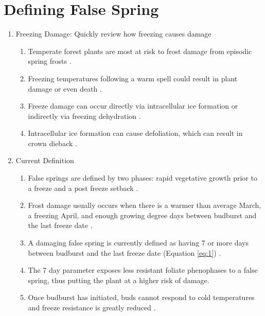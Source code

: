 \documentclass{article}\usepackage[]{graphicx}\usepackage[]{color}
\begin{document}


\section*{Defining False Spring}
\begin{enumerate}
\item Freezing Damage: Quickly review how freezing causes damage 
\begin{enumerate}
\item Temperate forest plants are most at risk to frost damage from episodic spring frosts \citep{Sakai1987}. 
\item Freezing temperatures following a warm spell could result in plant damage or even death \citep{Ludlum1968, Mock2007}.
\item Freeze damage can occur directly via intracellular ice formation or indirectly via freezing dehydration \citep{Pearce2001, Beck2004, Hofmann2015}.
\item Intracellular ice formation can cause defoliation, which can result in crown dieback \citep{Gu2008}. %
\end {enumerate}

\item Current Definition
\begin{enumerate}
\item False springs are defined by two phases: rapid vegetative growth prior to a freeze and a post freeze setback \citep{Gu2008}.
\item Frost damage usually occurs when there is a warmer than average March, a freezing April, and enough growing degree days between budburst and the last freeze date \citep{Augspurger2013}.
\item A damaging false spring is currently defined as having 7 or more days between budburst and the last freeze date (Equation \ref{eq:1}) \citep{Peterson2014}.
\item The 7 day parameter exposes less resistant foliate phenophases to a false spring, thus putting the plant at a higher risk of damage. 
\item Once budburst has initiated, buds cannot respond to cold temperatures and freeze resistance is greatly reduced \citep{Taschler2004, Lenz2013, Vitasse2014}.
\end{enumerate}
\end{enumerate}
\end{document}
